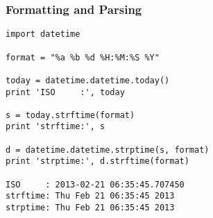 \begin{frame}[fragile]\frametitle{Formatting and Parsing}
\begin{lstlisting}
import datetime

format = "%a %b %d %H:%M:%S %Y"

today = datetime.datetime.today()
print 'ISO     :', today

s = today.strftime(format)
print 'strftime:', s

d = datetime.datetime.strptime(s, format)
print 'strptime:', d.strftime(format)

ISO     : 2013-02-21 06:35:45.707450
strftime: Thu Feb 21 06:35:45 2013
strptime: Thu Feb 21 06:35:45 2013
\end{lstlisting}
\end{frame}




